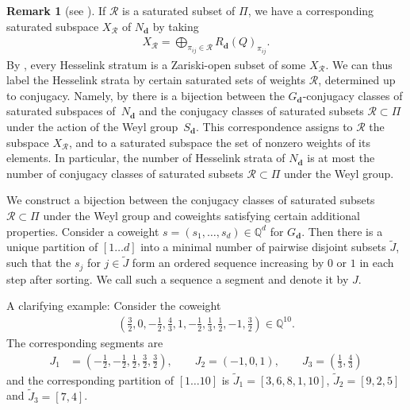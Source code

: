 \documentclass[10pt,a4paper]{amsart}
\newcommand{\R}{\mathcal{R}}
\numberwithin{equation}{section}
\theoremstyle{definition}
\newtheorem{Remark}[Theorem]{Remark}
\begin{document}
\begin{Remark}[{see \cite[Section 2.2]{LB}}] \label{rem saturated subsets}
If $\R$ is a saturated subset of $\Pi$, we have a corresponding saturated subspace $X_\R$ of $N_{\mathbf{d}}$ by taking
\begin{align*}
X_\R = \bigoplus_{\pi_{ij} \in \R} R_{\mathbf{d}}(Q)_{\pi_{ij}} .
\end{align*}
By \cite[Section 2.2]{LB}, every Hesselink stratum is a Zariski-open subset of some $X_\R$. We can thus label the Hesselink strata by certain saturated sets of weights $\R$, determined up to conjugacy. Namely, by \cite{Hesse} there is a bijection between the $G_{\mathbf{d}}$-conjugacy classes of saturated subspaces of~$N_{\mathbf{d}}$ and the conjugacy classes of saturated subsets $\R \subset \Pi$ under the action of the Weyl group~$S_{\mathbf{d}}$. %
This correspondence assigns to $\R$ the subspace $X_\R$, and to a saturated subspace the set of nonzero weights of its elements. In particular, the number of Hesselink strata of $N_{\mathbf{d}}$ is at most the number of conjugacy classes of saturated subsets $\R \subset \Pi$ under the Weyl group.

 \end{Remark}
We construct a bijection between the conjugacy classes of saturated subsets $\R \subset \Pi$ under the Weyl group and coweights satisfying certain additional properties.
Consider a coweight $s=(s_1, \dots, s_d) \in \mathbb{Q}^d$ for $G_{\mathbf{d}}$. Then there is a unique partition of $[1 \dots d]$ into a minimal number of pairwise disjoint subsets $\tilde{J}$, such that the $s_j$ for $j\in\tilde{J}$ form an ordered sequence increasing by $0$ or $1$ in each step after sorting. We call such a sequence a segment and denote it by $J$.

A clarifying example: Consider the coweight
\begin{align*}
\left(\frac{3}{2}, 0, -\frac{1}{2}, \frac{4}{3}, 1, - \frac{1}{2}, \frac{1}{3}, \frac{1}{2}, -1,\frac{3}{2}\right) \in \mathbb{Q}^{10} .
\end{align*}
The corresponding segments are
\begin{align*}
J_1 &= \left(-\frac{1}{2}, -\frac{1}{2}, \frac{1}{2}, \frac{3}{2}, \frac{3}{2}\right) , \qquad
J_2 = (-1, 0, 1) ,\qquad
J_3 = \left(\frac{1}{3}, \frac{4}{3}\right)
\end{align*}
and the corresponding partition of $[1 \dots 10]$ is $\tilde{J}_1 = [3, 6, 8, 1, 10]$, $\tilde{J}_2 = [9, 2, 5]$ and $\tilde{J}_3 = [7, 4]$.
\end{document}
